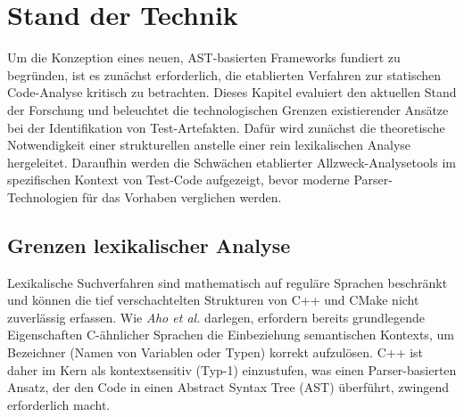 \documentclass[12pt,titlepage]{article}
\begin{document}
\section{Stand der Technik}
Um die Konzeption eines neuen, AST-basierten Frameworks fundiert zu begründen, ist es zunächst erforderlich, die etablierten Verfahren zur statischen Code-Analyse kritisch zu betrachten. Dieses Kapitel evaluiert den aktuellen Stand der Forschung und beleuchtet die technologischen Grenzen existierender Ansätze bei der Identifikation von Test-Artefakten. Dafür wird zunächst die theoretische Notwendigkeit einer strukturellen anstelle einer rein lexikalischen Analyse hergeleitet. Daraufhin werden die Schwächen etablierter Allzweck-Analysetools im spezifischen Kontext von Test-Code aufgezeigt, bevor moderne Parser-Technologien für das Vorhaben verglichen werden.


\subsection{Grenzen lexikalischer Analyse}
Lexikalische Suchverfahren sind mathematisch auf reguläre Sprachen beschränkt und können die tief verschachtelten Strukturen von C++ und CMake nicht zuverlässig erfassen. Wie \textit{Aho et al.} \cite[S.~209~ff.]{Aho_Lam_Sethi_Ullman_2007} darlegen, erfordern bereits grundlegende Eigenschaften C-ähnlicher Sprachen die Einbeziehung semantischen Kontexts, um Bezeichner (Namen von Variablen oder Typen) korrekt aufzulösen. C++ ist daher im Kern als kontextsensitiv (Typ-1) einzustufen, was einen Parser-basierten Ansatz, der den Code in einen Abstract Syntax Tree (AST) überführt, zwingend erforderlich macht.
\end{document}
